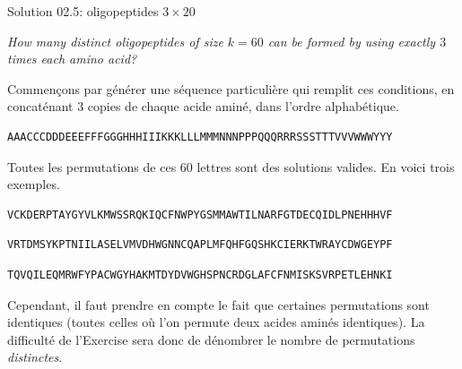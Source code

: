 \documentclass[ignorenonframetext,]{beamer}
\begin{document}
\begin{frame}[fragile]{Solution 02.5: oligopeptides \(3 \times 20\)}
\protect\hypertarget{solution-02.5-oligopeptides-3-times-20}{}

\emph{How many distinct oligopeptides of size \(k=60\) can be formed by
using exactly \(3\) times each amino acid?}

Commençons par générer une séquence particulière qui remplit ces
conditions, en concaténant 3 copies de chaque acide aminé, dans l'ordre
alphabétique.

\begin{verbatim}
AAACCCDDDEEEFFFGGGHHHIIIKKKLLLMMMNNNPPPQQQRRRSSSTTTVVVWWWYYY
\end{verbatim}

Toutes les permutations de ces 60 lettres sont des solutions valides. En
voici trois exemples.

\begin{verbatim}
VCKDERPTAYGYVLKMWSSRQKIQCFNWPYGSMMAWTILNARFGTDECQIDLPNEHHHVF
\end{verbatim}

\begin{verbatim}
VRTDMSYKPTNIILASELVMVDHWGNNCQAPLMFQHFGQSHKCIERKTWRAYCDWGEYPF
\end{verbatim}

\begin{verbatim}
TQVQILEQMRWFYPACWGYHAKMTDYDVWGHSPNCRDGLAFCFNMISKSVRPETLEHNKI
\end{verbatim}

Cependant, il faut prendre en compte le fait que certaines permutations
sont identiques (toutes celles où l'on permute deux acides aminés
identiques). La difficulté de l'Exercise sera donc de dénombrer le
nombre de permutations \emph{distinctes}.

\end{frame}
\end{document}
